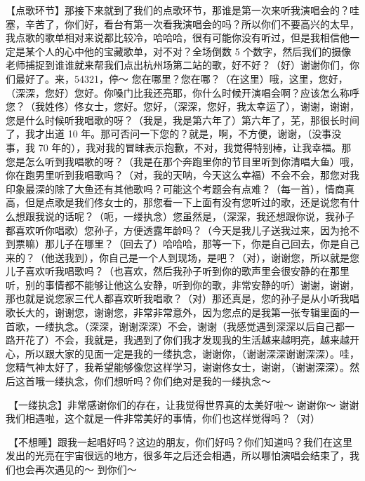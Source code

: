 \documentclass[
]{book}
\begin{document}
【点歌环节】那接下来就到了我们的点歌环节，那谁是第一次来听我演唱会的？哇塞，辛苦了，你们好，看台有第一次看我演唱会的吗？所以你们不要高兴的太早，我点歌的歌单相对来说都比较冷，哈哈哈，很有可能你没有听过，但是我相信他一定是某个人的心中他的宝藏歌单，对不对？全场倒数 5 个数字，然后我们的摄像老师捕捉到谁谁就来帮我们点出杭州场第二站的歌，好不好？（好）谢谢你们，你们最好了。来，54321，停～ 您在哪里？您在哪？（在这里）哦，这里，您好，（深深，您好）您好。你嗓门比我还亮耶，你什么时候开演唱会啊？应该怎么称呼您？（我姓佟）佟女士，您好。您好，（深深，您好，我太幸运了），谢谢，谢谢，您是什么时候听我唱歌的呀？（我是，我是第六年了）第六年了，芜，那很长时间了，我才出道 10 年。那可否问一下您的？就是，啊，不方便，谢谢，（没事没事，我 70 年的），我对我的冒昧表示抱歉，不对，我觉得特别棒，让我幸福。那您是怎么听到我唱歌的呀？（我是在那个奔跑里你的节目里听到你清唱大鱼）哦，你在跑男里听到我唱歌吗？（对，我的天呐，今天这么幸福）不会不会，那您对我印象最深的除了大鱼还有其他歌吗？可能这个考题会有点难？（每一首），情商真高，但是点歌是我们佟女士的，那您看一下上面有没有您听过的歌，还是说您有什么想跟我说的话呢？（呃，一缕执念）您虽然是，（深深，我还想跟你说，我孙子都喜欢听你唱歌）您孙子，方便透露年龄吗？（今天是我儿子送我过来，因为抢不到票嘛）那儿子在哪里？（回去了）哈哈哈，那等一下，你是自己回去，你是自己来的？（他送我到），你自己是一个人到现场，是吧？（对），谢谢您，所以就是您儿子喜欢听我唱歌吗？（也喜欢，然后我孙子听到你的歌声里会很安静的在那里听，别的事情都不能够让他这么安静，听到你的歌，非常安静的听）谢谢，谢谢，那也就是说您家三代人都喜欢听我唱歌？（对）那还真是，您的孙子是从小听我唱歌长大的，谢谢您，谢谢您，非常非常意外，因为您点的是我第一张专辑里面的一首歌，一缕执念。（深深，谢谢深深）不会，谢谢（我感觉遇到深深以后自己都一路开花了）不会，我就是，我遇到了你们我才发现我的生活越来越明亮，越来越开心，所以跟大家的见面一定是我的一缕执念，谢谢你，（谢谢深深谢谢深深）。哇，您精气神太好了，我希望能够像您这样学习，谢谢佟女士，谢谢，（谢谢深深）。然后这首哦一缕执念，你们想听吗？你们绝对是我的一缕执念～

🎵【一缕执念】非常感谢你们的存在，让我觉得世界真的太美好啦～ 谢谢你～ 谢谢我们相遇啦，这个就是一件非常美好的事情，你们也这样觉得吗？（对）

🎵【不想睡】跟我一起唱好吗？这边的朋友，你们好吗？你们知道吗？我们在这里发出的光亮在宇宙很远的地方，很多年之后还会相遇，所以哪怕演唱会结束了，我们也会再次遇见的～ 到你们～
\end{document}
